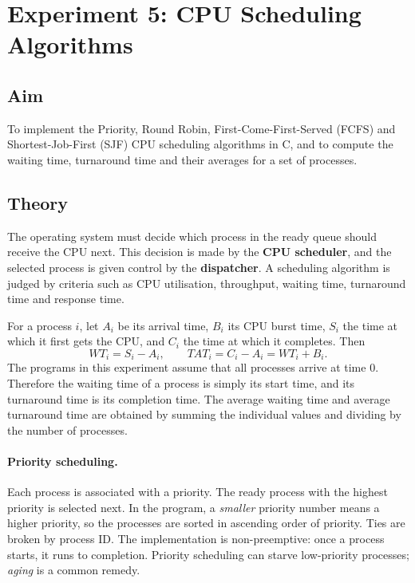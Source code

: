 \section{Experiment 5: CPU Scheduling Algorithms}
\label{exp:scheduling}

\subsection*{Aim}
To implement the Priority, Round Robin, First-Come-First-Served (FCFS) and Shortest-Job-First (SJF) CPU scheduling algorithms in C, and to compute the waiting time, turnaround time and their averages for a set of processes.

\subsection*{Theory}
The operating system must decide which process in the ready queue should receive the CPU next. This decision is made by the \textbf{CPU scheduler}, and the selected process is given control by the \textbf{dispatcher}. A scheduling algorithm is judged by criteria such as CPU utilisation, throughput, waiting time, turnaround time and response time.

For a process $i$, let $A_i$ be its arrival time, $B_i$ its CPU burst time, $S_i$ the time at which it first gets the CPU, and $C_i$ the time at which it completes. Then
\begin{equation*}
    WT_i = S_i - A_i, \qquad TAT_i = C_i - A_i = WT_i + B_i .
\end{equation*}
The programs in this experiment assume that all processes arrive at time $0$. Therefore the waiting time of a process is simply its start time, and its turnaround time is its completion time. The average waiting time and average turnaround time are obtained by summing the individual values and dividing by the number of processes.

\paragraph{Priority scheduling.}
Each process is associated with a priority. The ready process with the highest priority is selected next. In the program, a \emph{smaller} priority number means a higher priority, so the processes are sorted in ascending order of priority. Ties are broken by process ID. The implementation is non-preemptive: once a process starts, it runs to completion. Priority scheduling can starve low-priority processes; \emph{aging} is a common remedy.

